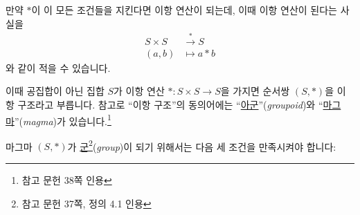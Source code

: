 \documentclass[12pt]{paper}
\begin{document}
  만약 $*$이 이 모든 조건들을 지킨다면 이항 연산이 되는데,
  이때 이항 연산이 된다는 사실을
  \begin{align*}
    S \times S & \xrightarrow{*} S \\
    \left( a , b \right) & \mapsto a * b
  \end{align*}
  와 같이 적을 수 있습니다.

  이때 공집합이 아닌 집합 $S$가 이항 연산 $* : S \times S \to S$을 가지면 순서쌍 $\left( S , * \right)$을 이항 구조라고 부릅니다.
  참고로 ``이항 구조''의 동의어에는 ``\underline{아군}''(\textit{groupoid})와 ``\underline{마그마}''(\textit{magma})가 있습니다.\footnote{참고 문헌 \cite{fraleigh2009} 38쪽 인용}

  마그마 $ \left( S , * \right) $가 \underline{군}\footnote{참고 문헌 \cite{fraleigh2009} 37쪽, 정의 4.1 인용}(\textit{group})이 되기 위해서는 다음 세 조건을 만족시켜야 합니다:
\end{document}
